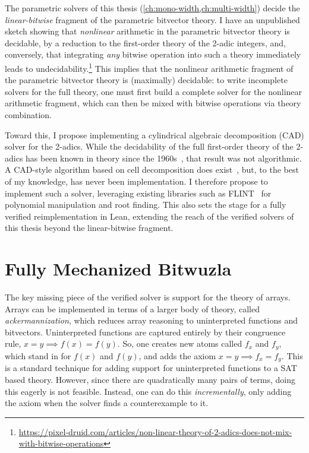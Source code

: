 The parametric solvers of this thesis (\cref{ch:mono-width,ch:multi-width})
decide the \emph{linear-bitwise} fragment of the parametric bitvector theory.
I have an unpublished sketch showing that \emph{nonlinear} arithmetic in the
parametric bitvector theory is decidable, by a reduction to the first-order
theory of the 2-adic integers, and, conversely, that integrating \emph{any}
bitwise operation into such a theory immediately leads to
undecidability.\footnote{%
\url{https://pixel-druid.com/articles/non-linear-theory-of-2-adics-does-not-mix-with-bitwise-operations}}
This implies that the nonlinear arithmetic fragment of the parametric
bitvector theory is (maximally) decidable: to write incomplete solvers for
the full theory, one must first build a complete solver for the nonlinear
arithmetic fragment, which can then be mixed with bitwise operations via
theory combination.

Toward this, I propose implementing a cylindrical algebraic decomposition (CAD) solver for the 2-adics.
While the decidability of the full first-order theory of the 2-adics has been known in theory since the
1960s~\citep{ax1966diophantine}, that result was not algorithmic. A CAD-style
algorithm based on cell decomposition does exist~\citep{quantifier-elimination-padic},
but, to the best of my knowledge, has never been implementation. I therefore propose to implement
such a solver, leveraging existing libraries such as FLINT~\citep{hart2013flint} for polynomial manipulation and root finding.
This also sets the stage for a fully verified reimplementation in Lean, extending
the reach of the verified solvers of this thesis beyond the linear-bitwise fragment.

\section{Fully Mechanized Bitwuzla}

The key missing piece of the verified solver is support for the theory of arrays.
Arrays can be implemented in terms of a larger body of theory, called \emph{ackermannization},
which reduces array reasoning to uninterpreted functions and bitvectors.
Uninterpreted functions are captured entirely by their congruence rule,
$x = y \implies f(x) = f(y)$. So, one creates new atoms called $f_x$ and $f_y$, which stand in for $f(x)$ and $f(y)$, and adds the axiom
$x = y \implies f_x = f_y$. This is a standard technique for adding support for uninterpreted functions to a SAT based theory.
However, since there are quadratically many pairs of terms,
doing this eagerly is not feasible.
Instead, one can do this \emph{incrementally}, only adding the axiom when the solver finds a counterexample to it.

